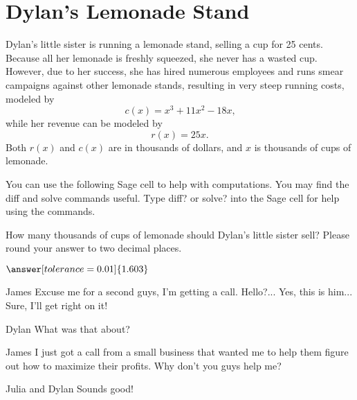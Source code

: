 \documentclass{ximera}
\begin{document}
\section{Dylan's Lemonade Stand}
Dylan's little sister is running a lemonade stand, selling a cup for 25 cents. Because all her lemonade is freshly squeezed, she never has a wasted cup. However, due to her success, she has hired numerous employees and runs smear campaigns against other lemonade stands, resulting in very steep running costs, modeled by $$c(x) = x^3+11x^2-18x\text{,}$$ while her revenue can be modeled by $$r(x) = 25x\text{.}$$ Both $r(x)$ and $c(x)$ are in thousands of dollars, and $x$ is thousands of cups of lemonade.
\begin{question}

You can use the following Sage cell to help with computations. You may find the diff and solve commands useful. Type diff? or solve? into the Sage cell for help using the commands.
\begin{onlineOnly}
\begin{sageCell}

\end{sageCell}
\end{onlineOnly}

How many thousands of cups of lemonade should Dylan's little sister sell? Please round your answer to two decimal places.

$\answer[tolerance=0.01]{1.603}$
\end{question}
\begin{dialogue}
\item[James] Excuse me for a second guys, I'm getting a call. Hello?... Yes, this is him... Sure, I'll get right on it!
\item[Dylan] What was that about?
\item[James] I just got a call from a small business that wanted me to help them figure out how to maximize their profits. Why don't you guys help me?
\item[Julia and Dylan] Sounds good!
\end{dialogue}
\end{document}

